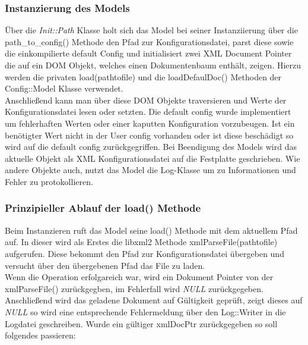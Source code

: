 \subsubsection{Instanzierung des Models}


Über die \emph{Init::Path} Klasse holt sich das Model bei seiner Instanziierung über die path\_to\_config() Methode
den Pfad zur Konfigurationsdatei, parst diese sowie die einkompilierte default Config und 
initialisiert zwei XML Document Pointer die auf ein DOM Objekt, welches einen Dokumentenbaum enthält, zeigen.
Hierzu werden die privaten load(pathtofile) und die loadDefaulDoc() Methoden der Config::Model Klasse verwendet.
\\   

Anschließend kann man über diese DOM Objekte traversieren und Werte der Konfigurationsdatei lesen oder setzten.
Die default config wurde implementiert um fehlerhaften Werten oder einer kaputten Konfiguration vorzubeugen. Ist ein benötigter Wert
nicht in der User config vorhanden oder ist diese beschädigt so wird auf die default config zurückgegriffen.
Bei Beendigung des Models wird das aktuelle Objekt als XML Konfigurationsdatei auf die Festplatte geschrieben.
Wie andere Objekte auch, nutzt das Model die Log-Klasse um zu Informationen und Fehler zu protokollieren.



\subsubsection{Prinzipieller Ablauf der load() Methode}

Beim Instanzieren ruft das Model seine load() Methode mit dem aktuellem Pfad auf.
In dieser wird als Erstes die libxml2 Methode xmlParseFile(pathtofile) aufgerufen. Diese bekommt den
Pfad zur Konfigurationsdatei übergeben und versucht über den übergebenen Pfad das File zu laden.
\\
Wenn die Operation erfolgareich war, wird ein Dokument Pointer von der xmlParseFile() 
zurückgegben, im Fehlerfall wird \emph{NULL} zurückgegeben.
\\
Anschließend wird das geladene Dokument auf Gültigkeit geprüft, zeigt dieses auf \emph{NULL} so wird eine entsprechende Fehlermeldung über den Log::Writer in die Logdatei geschreiben. Wurde ein gültiger xmlDocPtr zurückgegeben so soll folgendes passieren:

